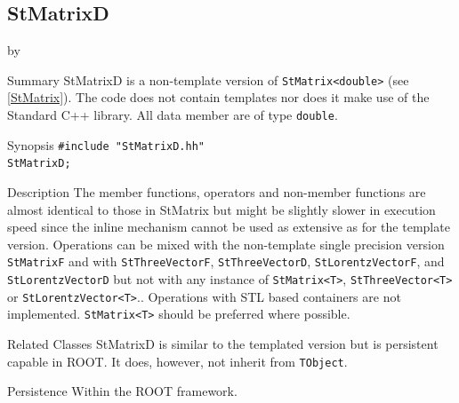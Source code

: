\documentclass[twoside]{article}
\newcommand{\entrylabel}[1]{\mbox{\textbf{{#1}}}\hfil}%
\newenvironment{entry}
{\begin{list}{}%
    {\renewcommand{\makelabel}{\entrylabel}%
     \setlength{\labelwidth}{90pt}%
     \setlength{\leftmargin}{\labelwidth}
     \advance\leftmargin by \labelsep%
      }%
    }%
  {\end{list}}
\newcommand{\Entrylabel}[1]%
{\raisebox{0pt}[1ex][0pt]{\makebox[\labelwidth][l]%
    {\parbox[t]{\labelwidth}{\hspace{0pt}\textbf{{#1}}}}}}
\newenvironment{Entry}%
{\renewcommand{\entrylabel}{\Entrylabel}\begin{entry}}%
  {\end{entry}}
\begin{document}
\subsection{StMatrixD } \label{StMatrixD}
\begin{Entry}
\item[Summary]
    StMatrixD is a non-template version of \verb+StMatrix<double>+
    (see \ref{StMatrix}). The code does not contain templates nor
    does it make use of the Standard C++ library. All data member are of
    type \texttt{double}.
    
\item[Synopsis]
    \verb+#include "StMatrixD.hh"+ \\
    \verb+StMatrixD;+
    
    
\item[Description]       
    The member functions, operators and non-member functions are almost identical
    to those in StMatrix but might be slightly slower in execution speed
    since the inline mechanism cannot be used as extensive as for the template
    version. Operations can be mixed with the non-template single precision version
    \texttt{StMatrixF} and with \texttt{StThreeVectorF}, \texttt{StThreeVectorD},
    \texttt{StLorentzVectorF}, and \texttt{StLorentzVectorD}
    but not with any instance of \verb+StMatrix<T>+, \verb+StThreeVector<T>+ or
    \verb+StLorentzVector<T>+..
    Operations with STL based containers are not implemented.
    \verb+StMatrix<T>+ should be preferred where possible.

\item[Related Classes]
    StMatrixD is similar to the templated version but
    is persistent capable in ROOT. It does, however, not inherit
    from \texttt{TObject}.

\item[Persistence]
    Within the ROOT framework.


\end{Entry}

%
%
\end{document}
